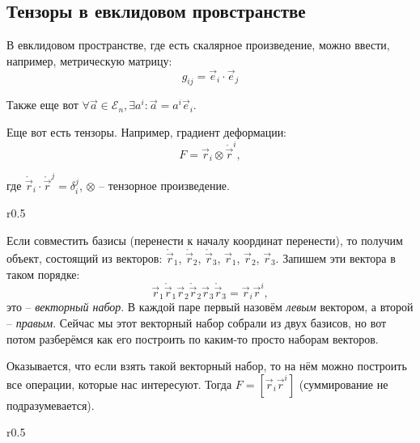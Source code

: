 \subsection{Тензоры в евклидовом провстранстве}

В евклидовом пространстве, где есть скалярное произведение, можно ввести, например, метрическую
матрицу:
\[
  g_{ij} = \vec{e}_i \cdot \vec{e}_j
\]

Также еще вот $\forall \vec{a} \in \mathcal{E}_n, \exists a^i :  \vec{a} = a^i \vec{e}_i$.

Еще вот есть тензоры. Например, градиент деформации:
\[
  F = \vec{r}_i \otimes \mathring{\vec{r}}^i,
\]

\begin{figure}[H]
	\centering
	
\end{figure}
где $\mathring{\vec{r}}_i \cdot \mathring{\vec{r}}^j = \delta_i^j$,
  $\otimes$ -- тензорное произведение.
  

\begin{wrapfigure}{r}{0.5\textwidth}
	\centering
	
\end{wrapfigure}

Если совместить базисы (перенести к началу координат перенести), то получим объект, состоящий
из векторов: $\mathring{\vec{r}}_1$, $\mathring{\vec{r}}_2$, $\mathring{\vec{r}}_3$, $\vec{r}_1$,
$\vec{r}_2$, $\vec{r}_3$. Запишем эти вектора в таком порядке:
\[
  \vec{r}_1 \mathring{\vec{r}}_1 \vec{r}_2 \mathring{\vec{r}}_2 \vec{r}_3 \mathring{\vec{r}}_3 = \vec{r}_i \vec{r}^i,
\]
это -- \emph{векторный набор}. В каждой паре первый назовём \emph{левым} вектором, а
второй -- \emph{правым}. Сейчас мы этот векторный набор собрали из двух базисов, но вот потом
разберёмся как его построить по каким-то просто наборам векторов. 

%	

Оказывается, что если взять такой векторный набор, то на нём можно построить все операции, которые
нас интересуют. Тогда $F = [\vec{r}_i \vec{r}^i]$ (суммирование не подразумевается).

\begin{wrapfigure}{r}{0.5\textwidth}
	\centering
	
\end{wrapfigure}

